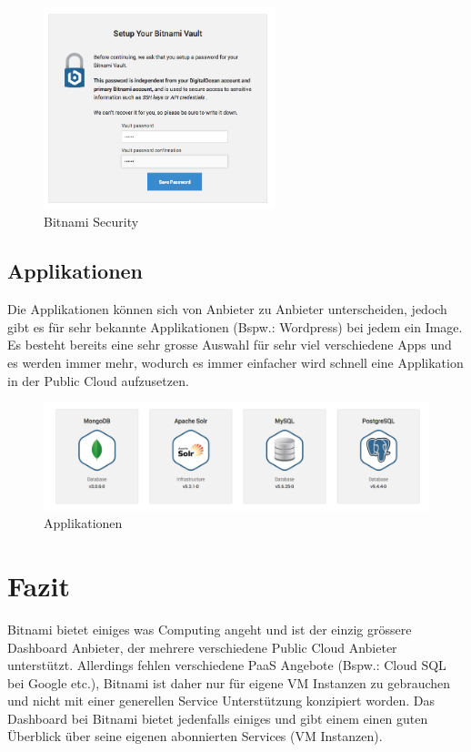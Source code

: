 \begin{figure}[!htbp]
  \centering
\includegraphics[width=0.6\textwidth]{./03_Analyse/03_Bitnami/images/bitnami_security}
\caption{Bitnami Security}
\end{figure}
\newpage

\subsection{Applikationen}
Die Applikationen können sich von Anbieter zu Anbieter unterscheiden, jedoch 
gibt es für sehr bekannte Applikationen (Bspw.: Wordpress) bei jedem ein 
Image.
Es besteht bereits eine sehr grosse Auswahl für sehr viel verschiedene Apps und 
es werden immer mehr, wodurch es immer einfacher wird schnell eine Applikation 
in der Public Cloud aufzusetzen.

\begin{figure}[!htbp]
\includegraphics[width=\textwidth]{./03_Analyse/03_Bitnami/images/apps}
\caption{Applikationen}
\end{figure}

\newpage 
\section{Fazit}
Bitnami bietet einiges was Computing angeht und ist der einzig grössere 
Dashboard Anbieter, der mehrere verschiedene Public Cloud Anbieter unterstützt.
Allerdings fehlen verschiedene PaaS Angebote (Bspw.: Cloud SQL bei Google etc.), 
Bitnami ist daher nur für eigene VM Instanzen zu gebrauchen und nicht mit einer 
generellen Service Unterstützung konzipiert worden.
Das Dashboard bei Bitnami bietet jedenfalls einiges und gibt einem einen guten 
Überblick über seine eigenen abonnierten Services (VM Instanzen).
